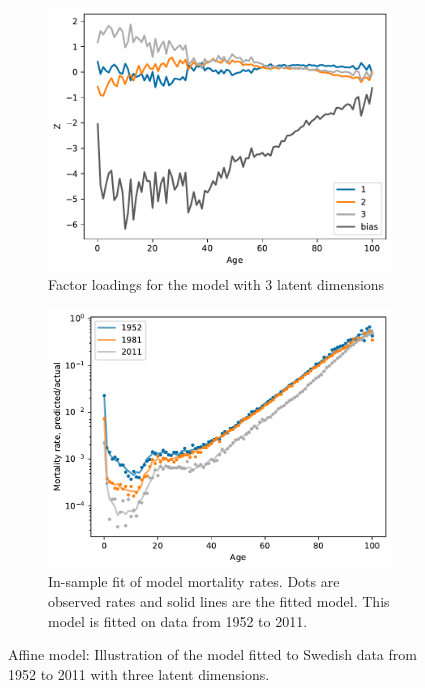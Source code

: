 \documentclass[11pt]{article}
\begin{document}
\begin{figure}
\begin{subfigure}[t]{0.45\textwidth}
    \end{subfigure}
    \hfill
    \begin{subfigure}[t]{0.45\textwidth}
        \centering
        \includegraphics[width=\textwidth]{figs/sweden_linear_1952_2011_Male_100_1_3loadings.pdf}
        \caption{Factor loadings for the model with 3 latent dimensions}
    \end{subfigure}
    \hfill
    \begin{subfigure}[t]{0.45\textwidth}
        \centering
        \includegraphics[width=\textwidth]{figs/sweden_linear_1952_2011_Male_100_1_3rateVsAge.pdf}
        \caption{In-sample fit of model mortality rates. Dots are observed rates and solid lines are the fitted model. This model is fitted on data from 1952 to 2011.}
        \label{fig:linear_mortality_rates_in_sample_fit_sweden}
    \end{subfigure}
    
    \caption{Affine model: Illustration of the model fitted to Swedish data from 1952 to 2011 with three latent dimensions.}
    \label{fig:linear_model_illustration_sweden}
\end{figure}
\end{document}
